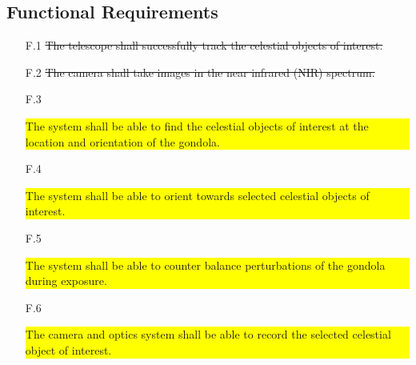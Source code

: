 \subsection{Functional Requirements}

\begin{enumerate}[topsep=0pt,itemsep=-0.5ex,partopsep=1ex,parsep=1ex]
    \item[F.1] \st{The telescope shall successfully track the celestial objects of interest.}
    \item[F.2] \st{The camera shall take images in the near infrared (NIR) spectrum.}
    \item[F.3] \colorbox{yellow}{\parbox{\textwidth}{The system shall be able to find the celestial objects of interest at the location and orientation of the gondola.}}
    \item[F.4] \colorbox{yellow}{\parbox{\textwidth}{The system shall be able to orient towards selected celestial objects of interest.}}
    \item[F.5] \colorbox{yellow}{\parbox{\textwidth}{The system shall be able to counter balance perturbations of the gondola during exposure.}}
    \item[F.6] \colorbox{yellow}{\parbox{\textwidth}{The camera and optics system shall be able to record the selected celestial object of interest.}}
\end{enumerate}
